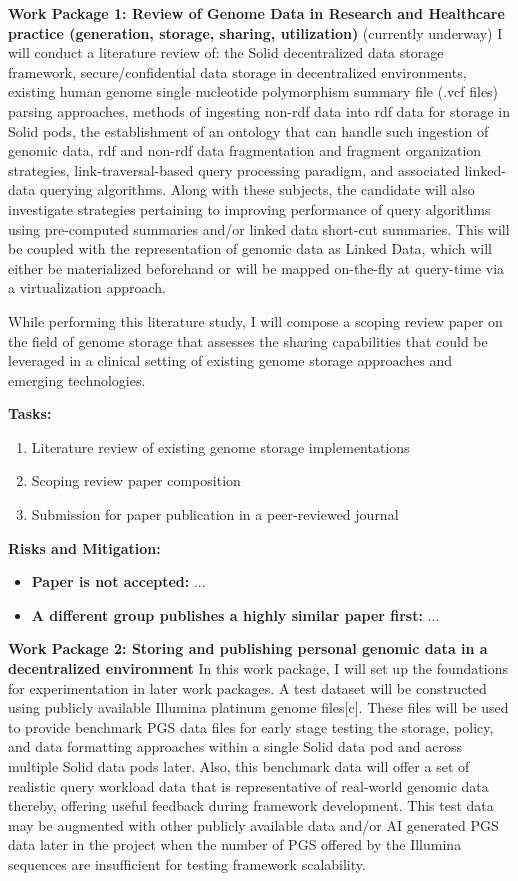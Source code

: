 \documentclass{article}
\begin{document}
\textbf{Work Package 1: Review of Genome Data in Research and Healthcare practice (generation, storage, sharing, utilization)} (currently underway)
I will conduct a literature review of: the Solid decentralized data storage framework, secure/confidential data storage in decentralized environments, existing human genome single nucleotide polymorphism summary file (.vcf files) parsing approaches, methods of ingesting non-rdf data into rdf data for storage in Solid pods, the establishment of an ontology that can handle such ingestion of genomic data, rdf and non-rdf data fragmentation and fragment organization strategies, link-traversal-based query processing paradigm, and associated linked-data querying algorithms. Along with these subjects, the candidate will also investigate strategies pertaining to improving performance of query algorithms using pre-computed summaries and/or linked data short-cut summaries. This will be coupled with the representation of genomic data as Linked Data, which will either be materialized beforehand or will be mapped on-the-fly at query-time via a virtualization approach.

While performing this literature study, I will compose a scoping review paper on the field of genome storage that assesses the sharing capabilities that could be leveraged in a clinical setting of existing genome storage approaches and emerging technologies. 

\textbf{Tasks:} 
\begin{enumerate}
	\item Literature review of existing genome storage implementations
	\item Scoping review paper composition
	\item Submission for paper publication in a peer-reviewed journal
\end{enumerate}

\textbf{Risks and Mitigation:}  
\begin{itemize}
	\item \textbf{Paper is not accepted:} ... 
	\item \textbf{A different group publishes a highly similar paper first:} ...
\end{itemize}

\textbf{Work Package 2: Storing and publishing personal genomic data in a decentralized environment} 
In this work package, I will set up the foundations for experimentation in later work packages. A test dataset will be constructed using publicly available Illumina platinum genome files[c]. These files will be used to provide benchmark PGS data files for early stage testing the storage, policy, and data formatting approaches within a single Solid data pod and across multiple Solid data pods later. Also, this benchmark data will offer a set of realistic query workload data that is representative of real-world genomic data thereby, offering useful feedback during framework development. This test data may be augmented with other publicly available data and/or AI generated PGS data later in the project when the number of PGS offered by the Illumina sequences are insufficient for testing framework scalability.
\end{document}

